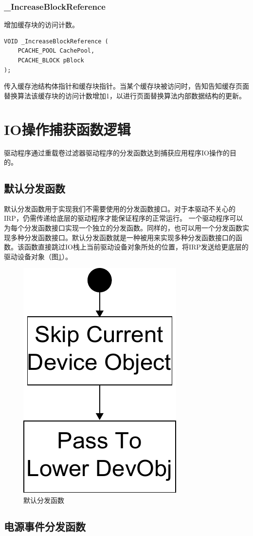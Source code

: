 \subsubsection{\_IncreaseBlockReference}
增加缓存块的访问计数。
\begin{lstlisting}
VOID _IncreaseBlockReference (
    PCACHE_POOL CachePool,
    PCACHE_BLOCK pBlock
);
\end{lstlisting}

传入缓存池结构体指针和缓存块指针。当某个缓存块被访问时，告知告知缓存页面替换算法该缓存块的访问计数增加1，以进行页面替换算法内部数据结构的更新。


\section{IO操作捕获函数逻辑}
\label{sec:capture_io_logic}

驱动程序通过重载卷过滤器驱动程序的分发函数达到捕获应用程序IO操作的目的。

\subsection{默认分发函数}

默认分发函数用于实现我们不需要使用的分发函数接口。对于本驱动不关心的IRP，仍需传递给底层的驱动程序才能保证程序的正常运行。
一个驱动程序可以为每个分发函数接口实现一个独立的分发函数。同样的，也可以用一个分发函数实现多种分发函数接口。默认分发函数就是一种被用来实现多种分发函数接口的函数。该函数直接跳过IO栈上当前驱动设备对象所处的位置，将IRP发送给更底层的驱动设备对象（图\ref{fig:df-default}）。

\begin{figure}[H]
\centering
\includegraphics[width=0.20\linewidth]{./graph/df-default}
\caption{默认分发函数}
\label{fig:df-default}
\end{figure}

\subsection{电源事件分发函数}

